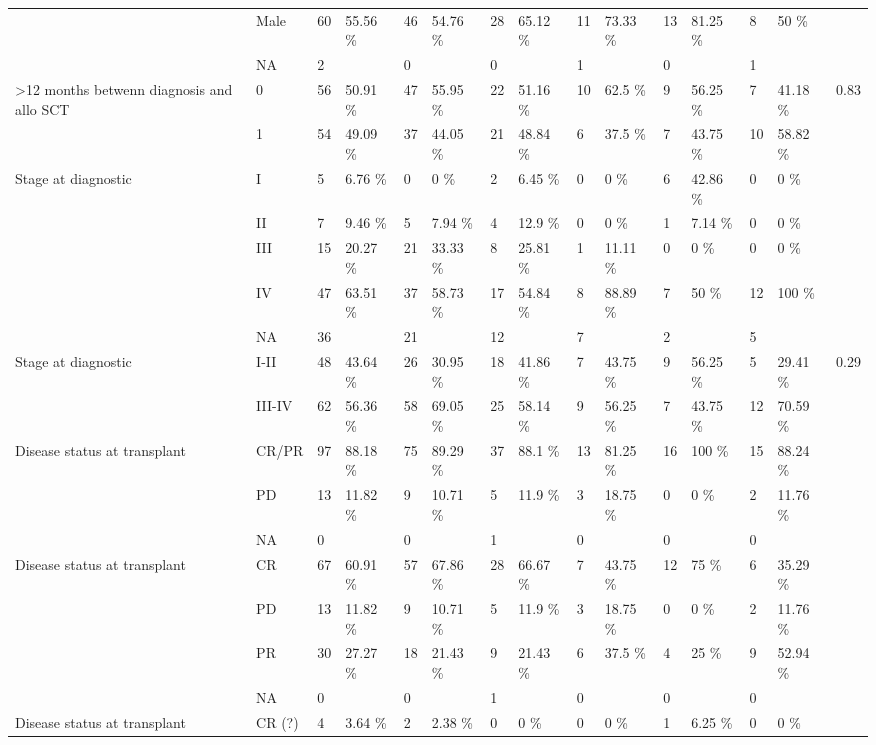\documentclass[a4paper,11pt] {article}
\begin{document}
\begin{landscape}
\begin{longtable}{lllllllllllllll}
   & Male & 60 & 55.56 \% & 46 & 54.76 \% & 28 & 65.12 \% & 11 & 73.33 \% & 13 & 81.25 \% & 8 & 50 \% &  \\ 
   & NA & 2 &  & 0 &  & 0 &  & 1 &  & 0 &  & 1 &  &  \\ 
  >12 months betwenn diagnosis and allo SCT & 0 & 56 & 50.91 \% & 47 & 55.95 \% & 22 & 51.16 \% & 10 & 62.5 \% & 9 & 56.25 \% & 7 & 41.18 \% & 0.83 \\ 
   & 1 & 54 & 49.09 \% & 37 & 44.05 \% & 21 & 48.84 \% & 6 & 37.5 \% & 7 & 43.75 \% & 10 & 58.82 \% &  \\ 
  Stage at diagnostic & I & 5 & 6.76 \% & 0 & 0 \% & 2 & 6.45 \% & 0 & 0 \% & 6 & 42.86 \% & 0 & 0 \% &  \\ 
   & II & 7 & 9.46 \% & 5 & 7.94 \% & 4 & 12.9 \% & 0 & 0 \% & 1 & 7.14 \% & 0 & 0 \% &  \\ 
   & III & 15 & 20.27 \% & 21 & 33.33 \% & 8 & 25.81 \% & 1 & 11.11 \% & 0 & 0 \% & 0 & 0 \% &  \\ 
   & IV & 47 & 63.51 \% & 37 & 58.73 \% & 17 & 54.84 \% & 8 & 88.89 \% & 7 & 50 \% & 12 & 100 \% &  \\ 
   & NA & 36 &  & 21 &  & 12 &  & 7 &  & 2 &  & 5 &  &  \\ 
  Stage at diagnostic & I-II & 48 & 43.64 \% & 26 & 30.95 \% & 18 & 41.86 \% & 7 & 43.75 \% & 9 & 56.25 \% & 5 & 29.41 \% & 0.29 \\ 
   & III-IV & 62 & 56.36 \% & 58 & 69.05 \% & 25 & 58.14 \% & 9 & 56.25 \% & 7 & 43.75 \% & 12 & 70.59 \% &  \\ 
  Disease status at transplant & CR/PR & 97 & 88.18 \% & 75 & 89.29 \% & 37 & 88.1 \% & 13 & 81.25 \% & 16 & 100 \% & 15 & 88.24 \% &  \\ 
   & PD & 13 & 11.82 \% & 9 & 10.71 \% & 5 & 11.9 \% & 3 & 18.75 \% & 0 & 0 \% & 2 & 11.76 \% &  \\ 
   & NA & 0 &  & 0 &  & 1 &  & 0 &  & 0 &  & 0 &  &  \\ 
  Disease status at transplant & CR & 67 & 60.91 \% & 57 & 67.86 \% & 28 & 66.67 \% & 7 & 43.75 \% & 12 & 75 \% & 6 & 35.29 \% &  \\ 
   & PD & 13 & 11.82 \% & 9 & 10.71 \% & 5 & 11.9 \% & 3 & 18.75 \% & 0 & 0 \% & 2 & 11.76 \% &  \\ 
   & PR & 30 & 27.27 \% & 18 & 21.43 \% & 9 & 21.43 \% & 6 & 37.5 \% & 4 & 25 \% & 9 & 52.94 \% &  \\ 
   & NA & 0 &  & 0 &  & 1 &  & 0 &  & 0 &  & 0 &  &  \\ 
  Disease status at transplant & CR (?) & 4 & 3.64 \% & 2 & 2.38 \% & 0 & 0 \% & 0 & 0 \% & 1 & 6.25 \% & 0 & 0 \% &  \\ 

\end{longtable}
\end{landscape}
\end{document}
